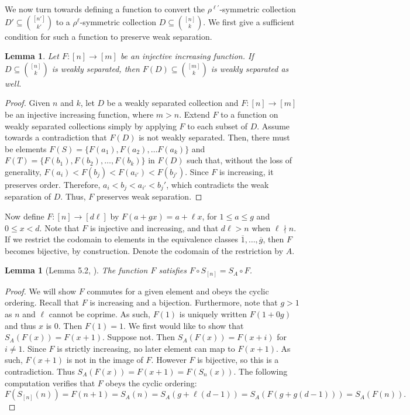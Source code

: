 \documentclass[11pt]{amsart}
\theoremstyle{plain}
\newtheorem{lemma}[theorem]{Lemma}
\theoremstyle{definition}
\begin{document}
We now turn towards defining a function to convert the $\rho^{\ell'}$-symmetric collection $D'\subseteq {[n'] \choose k'}$ to a $\rho^\ell$-symmetric collection $D\subseteq {[n]\choose k}$. We first give a sufficient condition for such a function to preserve weak separation.
\begin{lemma}\label{Lemma:incPreserve}
Let $F:[n]\to [m]$ be an injective increasing function. If $D\subseteq {[n]\choose k}$ is weakly separated, then $F(D)\subseteq {[m]\choose k}$ is weakly separated as well. 

\end{lemma} 
\begin{proof}
Given $n$ and $k$, let $D$ be a weakly separated collection and $F:[n] \rightarrow [m]$ be an injective increasing function, where $m > n$. Extend $F$ to a function on weakly separated collections simply by applying $F$ to each subset of $D$. Assume towards a contradiction that $F(D)$ is not weakly separated. 
Then, there must be elements $F(S)=\{F(a_1), F(a_2), \dots F(a_k)\}$ and $F(T)=\{F(b_1), F(b_2), \dots, F(b_k)\}$ in $F(D)$ such that, without the loss of generality, $F(a_i) < F(b_j) <F( a_{i'})< F(b_{j'})$. Since $F$ is increasing, it preserves order. Therefore, $a_i < b_j < a_{i'}<b_j'$, which contradicts the weak separation of $D$. Thus, $F$ preserves weak separation.       
\end{proof}




Now define $F:[n] \rightarrow [d\ell]$ by $F(a+gx)=a+\ell x$, for $1 \leq a \leq g$ and $0 \leq x < d$. Note that $F$ is injective and increasing, and that $d\ell > n$ when $\ell \nmid n$. If we restrict the codomain to elements in the equivalence classes $\overline{1},\dots,\overline{g}$, then $F$ becomes bijective, by construction. Denote the codomain of the restriction by $A$. 
\begin{lemma}[Lemma 5.2, \cite{PasqTZ2019}]\label{Lemma:Commutes}
The function $F$ satisfies $F \circ S_{[n]}=S_{A} \circ F$. 
 \end{lemma}
\begin{proof}
We will show $F$ commutes for a given element and obeys the cyclic ordering.  Recall that $F$ is increasing and a bijection. Furthermore, note that $g>1$ as $n$ and $\ell$ cannot be coprime. As such, $F(1)$ is uniquely written $F(1+0g)$ and thus $x$ is $0$. Then $F(1)=1$.
We first would like to show that $S_A(F(x))=F(x+1)$. Suppose not. Then $S_A(F(x))=F(x+i)$ for $i\neq 1$. Since $F$ is strictly increasing, no later element can map to $F(x+1)$. As such, $F(x+1)$ is not in the image of $F.$ However $F$ is bijective, so this is a contradiction. Thus $S_A(F(x))=F(x+1)=F(S_{n}(x)).$ 
The following computation verifies that $F$ obeys the cyclic ordering: $$F(S_{[n]}(n))=F(n+1)=S_{A}(n)=S_A(g+\ell(d-1))=S_A(F(g+g(d-1)))=S_A(F(n)).$$
\end{proof}
\end{document}
